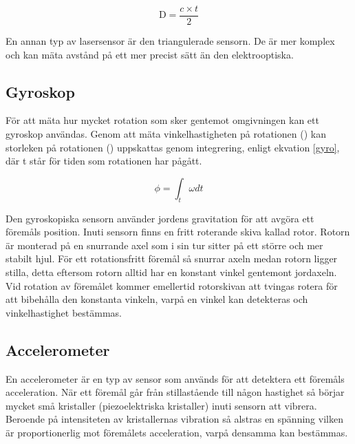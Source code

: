 \documentclass[11pt]{article}
\begin{document}
\begin{flushleft}
\begin{equation}\label{laser_eq}
	\textrm{D} = \frac {c \times t}{2}						
\end{equation}

En annan typ av lasersensor är den triangulerade sensorn. De är mer komplex och kan mäta avstånd på ett mer precist sätt än den elektrooptiska. \cite{website:mti}

\subsection{Gyroskop}
För att mäta hur mycket rotation som sker gentemot omgivningen kan ett gyroskop användas. Genom att mäta vinkelhastigheten på rotationen (\textomega) kan storleken på rotationen (\straightphi) uppskattas genom integrering, enligt ekvation \ref{gyro}, där t står för tiden som rotationen har pågått. \cite{Gyroscope}

\begin{equation}\label{gyro}
	\phi = \int_{t}^{ }\omega dt 						
\end{equation}

Den gyroskopiska sensorn använder jordens gravitation för att avgöra ett föremåls position. Inuti sensorn finns en fritt roterande skiva kallad rotor. Rotorn är monterad på en snurrande axel som i sin tur sitter på ett större och mer stabilt hjul. För ett rotationsfritt föremål så snurrar axeln medan rotorn ligger stilla, detta eftersom rotorn alltid har en konstant vinkel gentemont jordaxeln. Vid rotation av föremålet kommer emellertid rotorskivan att tvingas rotera för att bibehålla den konstanta vinkeln, varpå en vinkel kan detekteras och vinkelhastighet bestämmas. \cite{Gyro}

\subsection{Accelerometer}
En accelerometer är en typ av sensor som används för att detektera ett föremåls acceleration. När ett föremål går från stillastående till någon hastighet så börjar mycket små kristaller (piezoelektriska kristaller) inuti sensorn att vibrera. Beroende på intensiteten av kristallernas vibration så alstras en spänning vilken är proportionerlig mot föremålets acceleration, varpå densamma kan bestämmas. \cite{Accelerometer}





\end{flushleft}
\end{document}
